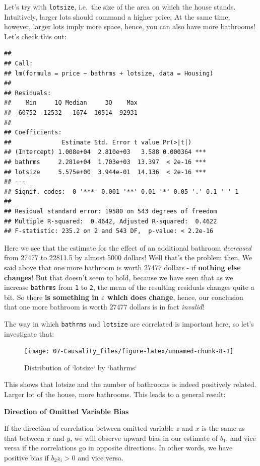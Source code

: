 \documentclass[]{book}
\newenvironment{note}{\begin{tcolorbox}[colback=blue!5!white,colframe=blue!75!black]}{\end{tcolorbox}}
\begin{document}
Let's try with \texttt{lotsize}, i.e.~the size of the area on which the
house stands. Intuitively, larger lots should command a higher price; At
the same time, however, larger lots imply more space, hence, you can
also have more bathrooms! Let's check this out:

\begin{verbatim}
## 
## Call:
## lm(formula = price ~ bathrms + lotsize, data = Housing)
## 
## Residuals:
##    Min     1Q Median     3Q    Max 
## -60752 -12532  -1674  10514  92931 
## 
## Coefficients:
##              Estimate Std. Error t value Pr(>|t|)    
## (Intercept) 1.008e+04  2.810e+03   3.588 0.000364 ***
## bathrms     2.281e+04  1.703e+03  13.397  < 2e-16 ***
## lotsize     5.575e+00  3.944e-01  14.136  < 2e-16 ***
## ---
## Signif. codes:  0 '***' 0.001 '**' 0.01 '*' 0.05 '.' 0.1 ' ' 1
## 
## Residual standard error: 19580 on 543 degrees of freedom
## Multiple R-squared:  0.4642, Adjusted R-squared:  0.4622 
## F-statistic: 235.2 on 2 and 543 DF,  p-value: < 2.2e-16
\end{verbatim}

Here we see that the estimate for the effect of an additional bathroom
\emph{decreased} from 27477 to 22811.5 by almost 5000 dollars! Well
that's the problem then. We said above that one more bathroom is worth
27477 dollars - if \textbf{nothing else changes}! But that doesn't seem
to hold, because we have seen that as we increase \texttt{bathrms} from
\texttt{1} to \texttt{2}, the mean of the resulting residuals changes
quite a bit. So there \textbf{is something in \(\varepsilon\) which does
change}, hence, our conclusion that one more bathroom is worth 27477
dollars is in fact \emph{invalid}!

The way in which \texttt{bathrms} and \texttt{lotsize} are correlated is
important here, so let's investigate that:

\begin{figure}

{\centering \texttt{[image: 07-Causality\_files/figure-latex/unnamed-chunk-8-1]} 

}

\caption{Distribution of `lotsize` by `bathrms`}\label{fig:unnamed-chunk-8}
\end{figure}

This shows that lotsize and the number of bathrooms is indeed positively
related. Larger lot of the house, more bathrooms. This leads to a
general result:

\begin{note}
\textbf{Direction of Omitted Variable Bias}

If the direction of correlation between omitted variable \(z\) and \(x\)
is the same as that between \(x\) and \(y\), we will observe upward bias
in our estimate of \(b_1\), and vice versa if the correlations go in
opposite directions. In other words, we have positive bias if
\(b_2 z_i > 0\) and vice versa.
\end{note}
\end{document}

